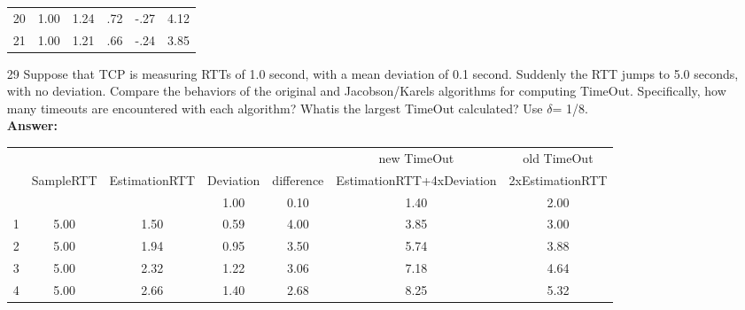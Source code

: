 \documentclass[a4paper]{article}
\begin{document}
\begin{itemize}
\begin{tabular}{cccccc}
	      	20        & 1.00      & 1.24          & .72       & -.27       & 4.12    \\
	      	21        & 1.00      & 1.21          & .66       & -.24       & 3.85    \\
	      \end{tabular} 
	\item[29] Suppose that TCP is measuring RTTs of 1.0 second, with a mean deviation of 0.1 second. Suddenly the RTT jumps to 5.0 seconds, with no deviation. Compare the behaviors of the original and Jacobson/Karels algorithms for computing TimeOut. Specifically, how many timeouts are encountered with each algorithm? Whatis the largest TimeOut calculated? Use $\si{\delta}$= 1/8. \\
	      \textbf{Answer:} \\
	      \begin{tabular}{ccccccc}
	      	  &           &               &           &            & new TimeOut               & old TimeOut     \\
	      	  & SampleRTT & EstimationRTT & Deviation & difference & EstimationRTT+4xDeviation & 2xEstimationRTT \\
	      	  &           &               & 1.00      & 0.10       & 1.40                      & 2.00            \\
	      	1 & 5.00      & 1.50          & 0.59      & 4.00       & 3.85                      & 3.00            \\
	      	2 & 5.00      & 1.94          & 0.95      & 3.50       & 5.74                      & 3.88            \\
	      	3 & 5.00      & 2.32          & 1.22      & 3.06       & 7.18                      & 4.64            \\
	      	4 & 5.00      & 2.66          & 1.40      & 2.68       & 8.25                      & 5.32            \\
	      \end{tabular}
\end{itemize}
\end{document}
